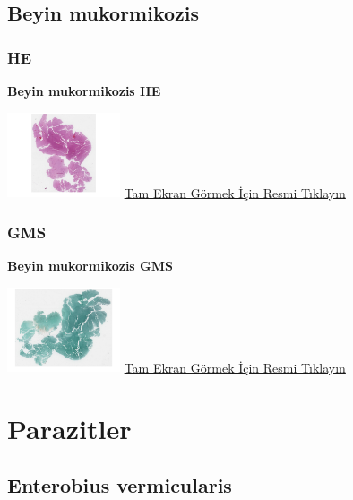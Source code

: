 \documentclass[
  letterpaper,
  DIV=11,
  numbers=noendperiod]{scrreprt}
\begin{document}
\hypertarget{sec-beyin-mukormikozis}{%
\section{Beyin mukormikozis}\label{sec-beyin-mukormikozis}}

\hypertarget{he-5}{%
\subsection{HE}\label{he-5}}

\textbf{Beyin mukormikozis HE}

\href{https://images.patolojiatlasi.com/brain-mucormycosis/HE.html}{\includegraphics[width=0.25\textwidth,height=\textheight]{./screenshots/brain-mucormycosis_screenshot.png}}
\href{https://images.patolojiatlasi.com/brain-mucormycosis/HE.html}{Tam
Ekran Görmek İçin Resmi Tıklayın}

\hypertarget{gms}{%
\subsection{GMS}\label{gms}}

\textbf{Beyin mukormikozis GMS}

\href{https://images.patolojiatlasi.com/brain-mucormycosis/GMS.html}{\includegraphics[width=0.25\textwidth,height=\textheight]{./screenshots/brain-mucormycosis-GMS_screenshot.png}}
\href{https://images.patolojiatlasi.com/brain-mucormycosis/GMS.html}{Tam
Ekran Görmek İçin Resmi Tıklayın}

\hypertarget{sec-parazitler}{%
\chapter{Parazitler}\label{sec-parazitler}}

\hypertarget{sec-enterobius-vermicularis}{%
\section{Enterobius vermicularis}\label{sec-enterobius-vermicularis}}
\end{document}
